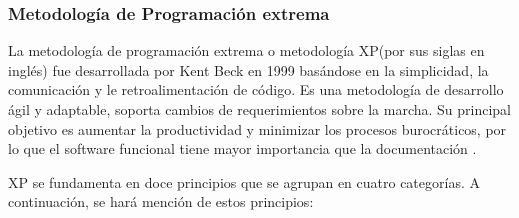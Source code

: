 \subsubsection{Metodología de Programación extrema}
La metodología de programación extrema o metodología XP(por sus siglas en inglés) fue
 desarrollada por Kent Beck en 1999 basándose en la simplicidad, la comunicación 
 y le retroalimentación de código. Es una metodología de desarrollo ágil y 
 adaptable, soporta cambios de requerimientos sobre la marcha. Su principal 
 objetivo es aumentar la productividad y minimizar los procesos burocráticos, 
 por lo que el software funcional tiene mayor importancia que la documentación
 \cite{Ref_XP}.
\\
\par
  XP se fundamenta en doce principios que se agrupan en cuatro categorías. A 
  continuación, se hará mención de estos principios:
